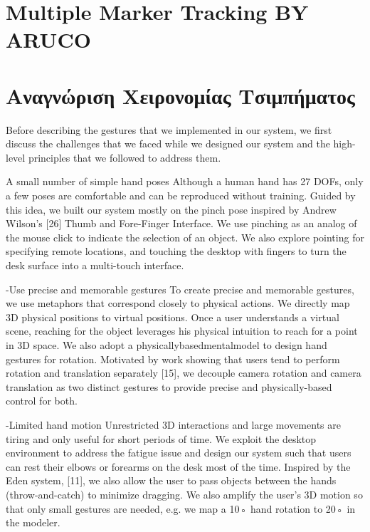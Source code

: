 \section{Multiple Marker Tracking BY ARUCO}



\section{Αναγνώριση Χειρονομίας Τσιμπήματος}



Before describing the gestures that we implemented in our
system, we first discuss the challenges that we faced while
we designed our system and the high-level principles that we
followed to address them.

A small number of simple hand poses Although a human hand has 27 DOFs, only a few poses are comfortable and can be reproduced without training. Guided by this idea, we built our system mostly on the pinch pose inspired by Andrew Wilson’s [26] Thumb and Fore-Finger Interface. We use pinching as an analog of the mouse click to indicate the selection of an object. We also explore pointing for specifying remote locations, and touching the desktop with fingers to turn the desk surface into a multi-touch interface. 

-Use precise and memorable gestures 
To create precise and memorable gestures, we use metaphors that correspond closely to physical actions. We directly map 3D physical positions to virtual positions. Once a user understands a virtual scene, reaching for the object leverages his physical intuition to reach for a point in 3D space. We also adopt a physicallybasedmentalmodel to design hand gestures for rotation. Motivated by work showing that users tend to perform rotation and translation separately [15], we decouple camera rotation and camera translation as two distinct gestures to provide precise and physically-based control for both. 

-Limited hand motion 
Unrestricted 3D interactions and large movements are tiring and only useful for short periods of time. We exploit the desktop environment to address the fatigue issue and design our system such that users can rest their elbows or forearms on the desk most of the time. Inspired by the Eden system, [11], we also allow the user to pass objects between the hands (throw-and-catch) to minimize dragging. We also amplify the user’s 3D motion so that only small gestures are needed, e.g. we map a 10◦ hand rotation to 20◦ in the modeler.



